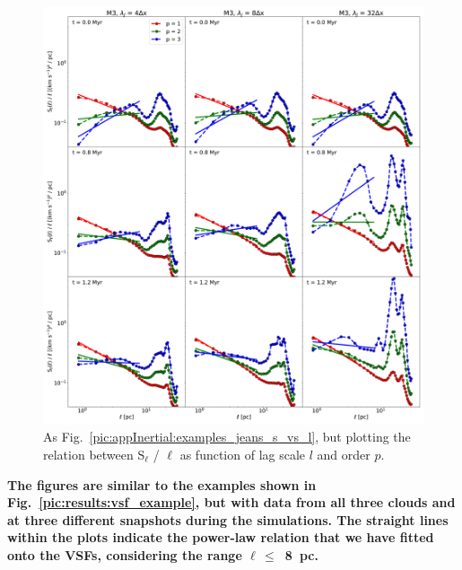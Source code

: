  	
\begin{figure}
    \centering
    \includegraphics[width=\textwidth]{app_examples_jeans_sl_l.pdf}
    \caption{
        As Fig.~\ref{pic:appInertial:examples_jeans_s_vs_l}, but plotting the relation between S$_{\ell}$ / $\ell$ as function of lag scale $l$ and order $p$.
    }
    \label{pic:appInertial:examples_jeans_sl_vs_l}
\end{figure}


\textbf{
    The figures are similar to the examples shown in Fig.~\ref{pic:results:vsf_example}, but with data from all three clouds and at three different snapshots during the simulations.
    The straight lines within the plots indicate the power-law relation that we have fitted onto the VSFs, considering the range $\ell\,\leq$~8~pc.
}

